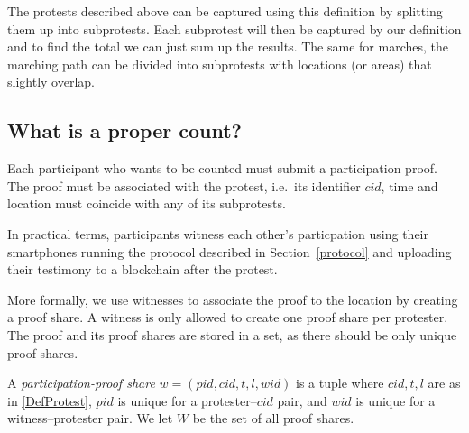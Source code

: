 The protests described above can be captured using this definition by splitting 
them up into subprotests.
Each subprotest will then be captured by our definition and to find the total 
we can just sum up the results.
The same for marches, the marching path can be divided into subprotests with 
locations (or areas) that slightly overlap.

\subsection{What is a proper count?}

Each participant who wants to be counted must submit a participation proof.
The proof must be associated with the protest, i.e.\ its identifier \(cid\), 
time and location must coincide with any of its subprotests.

In practical terms, participants witness each other's particpation
using their smartphones running the protocol described in
Section~\ref{protocol} and uploading their testimony to a blockchain
after the protest. 

More formally, we use witnesses to associate the proof to the location by creating a proof 
share.
A witness is only allowed to create one proof share per protester.
The proof and its proof shares are stored in a set, as there should be only 
unique proof shares.

\begin{definition}
  A \emph{participation-proof share} \(w = (pid, cid, t, l, wid)\) is a tuple 
  where
  \(cid, t, l\) are as in \cref{DefProtest},
  \(pid\) is unique for a protester--\(cid\) pair, and
  \(wid\) is unique for a witness--protester pair.
  We let \(W\) be the set of all proof shares.
\end{definition}

